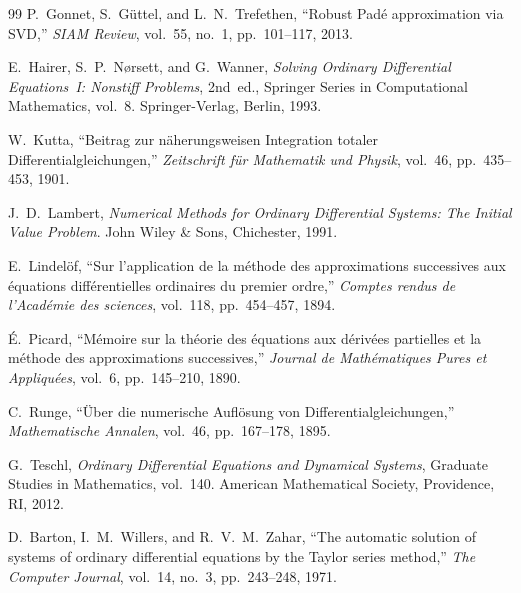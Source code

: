 \documentclass[12pt,a4paper]{article}
\theoremstyle{definition}
\theoremstyle{remark}
\begin{document}
\begin{thebibliography}{99}
P.~Gonnet, S.~Güttel, and L.~N.~Trefethen,
``Robust {P}adé approximation via {SVD},''
\textit{SIAM Review},
vol.~55, no.~1, pp.~101--117, 2013.

E.~Hairer, S.~P.~Nørsett, and G.~Wanner,
\textit{Solving Ordinary Differential Equations~{I}: Nonstiff
Problems}, 2nd~ed.,
Springer Series in Computational Mathematics, vol.~8.
Springer-Verlag, Berlin, 1993.

W.~Kutta,
``Beitrag zur näherungsweisen {I}ntegration totaler
{D}ifferentialgleichungen,''
\textit{Zeitschrift für Mathematik und Physik},
vol.~46, pp.~435--453, 1901.

J.~D.~Lambert,
\textit{Numerical Methods for Ordinary Differential Systems:
The Initial Value Problem}.
John Wiley \& Sons, Chichester, 1991.

E.~Lindelöf,
``Sur l'application de la méthode des approximations successives
aux équations différentielles ordinaires du premier ordre,''
\textit{Comptes rendus de l'Académie des sciences},
vol.~118, pp.~454--457, 1894.

{É}.~Picard,
``Mémoire sur la théorie des équations aux dérivées partielles
et la méthode des approximations successives,''
\textit{Journal de Mathématiques Pures et Appliquées},
vol.~6, pp.~145--210, 1890.

C.~Runge,
``Über die numerische {A}uflösung von
{D}ifferentialgleichungen,''
\textit{Mathematische Annalen},
vol.~46, pp.~167--178, 1895.

G.~Teschl,
\textit{Ordinary Differential Equations and Dynamical Systems},
Graduate Studies in Mathematics, vol.~140.
American Mathematical Society, Providence, RI, 2012.

D.~Barton, I.~M.~Willers, and R.~V.~M.~Zahar,
``The automatic solution of systems of ordinary differential equations by the Taylor series method,''
\textit{The Computer Journal}, vol.~14, no.~3, pp.~243--248, 1971.

\end{thebibliography}
\end{document}
